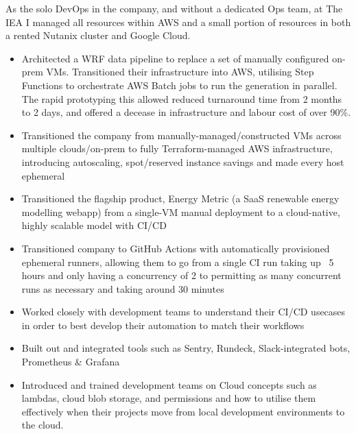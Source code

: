\documentclass[10pt,a4paper,ragged2e]{altacv}
\begin{document}

\begin{fullwidth}
\makecvheader
\end{fullwidth}




As the solo DevOps in the company, and without a dedicated Ops team, at The IEA I managed all resources within AWS and a small portion of resources in both a rented Nutanix cluster and Google Cloud.
\smallskip
\begin{itemize}
    \item Architected a WRF data pipeline to replace a set of manually configured on-prem VMs. Transitioned their infrastructure into AWS, utilising Step Functions to orchestrate AWS Batch jobs to run the generation in parallel. The rapid prototyping this allowed reduced turnaround time from 2 months to 2 days, and offered a decease in infrastructure and labour cost of over 90\%.
    \item Transitioned the company from manually-managed/constructed VMs across multiple clouds/on-prem to fully Terraform-managed AWS infrastructure, introducing autoscaling, spot/reserved instance savings and made every host ephemeral
    \item Transitioned the flagship product, Energy Metric (a SaaS renewable energy modelling webapp) from a single-VM manual deployment to a cloud-native, highly scalable model with CI/CD
    \item Transitioned company to GitHub Actions with automatically provisioned ephemeral runners, allowing them to go from a single CI run taking up ~5 hours and only having a concurrency of 2 to permitting as many concurrent runs as necessary and taking around 30 minutes
    \item Worked closely with development teams to understand their CI/CD usecases in order to best develop their automation to match their workflows
    \item Built out and integrated tools such as Sentry, Rundeck, Slack-integrated bots, Prometheus \& Grafana
    \item Introduced and trained development teams on Cloud concepts such as lambdas, cloud blob storage, and permissions and how to utilise them effectively when their projects move from local development environments to the cloud.
\end{itemize}
\end{document}
